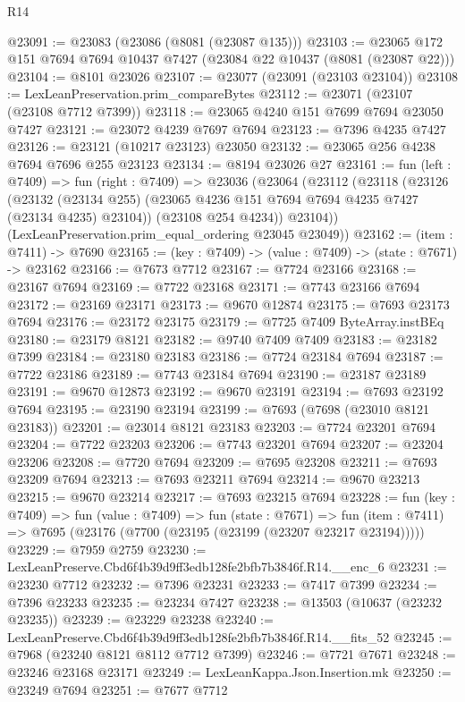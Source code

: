 \begin{lexlean}{R14}
\begin{coremodule}
@23091 := @23083 (@23086 (@8081 (@23087 @135)))
@23103 := @23065 @172 @151 @7694 @7694 @10437 @7427 (@23084 @22 @10437 (@8081 (@23087 @22)))
@23104 := @8101 @23026
@23107 := @23077 (@23091 (@23103 @23104))
@23108 := LexLeanPreservation.prim_compareBytes
@23112 := @23071 (@23107 (@23108 @7712 @7399))
@23118 := @23065 @4240 @151 @7699 @7694 @23050 @7427
@23121 := @23072 @4239 @7697 @7694
@23123 := @7396 @4235 @7427
@23126 := @23121 (@10217 @23123) @23050
@23132 := @23065 @256 @4238 @7694 @7696 @255 @23123
@23134 := @8194 @23026 @27
@23161 := fun (left : @7409) =>
  fun (right : @7409) =>
  @23036
    (@23064
      (@23112
        (@23118
          (@23126
            (@23132 (@23134 @255) (@23065 @4236 @151 @7694 @7694 @4235 @7427 (@23134 @4235) @23104))
            (@23108 @254 @4234))
          @23104))
      (LexLeanPreservation.prim_equal_ordering @23045 @23049))
@23162 := (item : @7411) -> @7690
@23165 := (key : @7409) -> (value : @7409) -> (state : @7671) -> @23162
@23166 := @7673 @7712
@23167 := @7724 @23166
@23168 := @23167 @7694
@23169 := @7722 @23168
@23171 := @7743 @23166 @7694
@23172 := @23169 @23171
@23173 := @9670 @12874
@23175 := @7693 @23173 @7694
@23176 := @23172 @23175
@23179 := @7725 @7409 ByteArray.instBEq
@23180 := @23179 @8121
@23182 := @9740 @7409 @7409
@23183 := @23182 @7399
@23184 := @23180 @23183
@23186 := @7724 @23184 @7694
@23187 := @7722 @23186
@23189 := @7743 @23184 @7694
@23190 := @23187 @23189
@23191 := @9670 @12873
@23192 := @9670 @23191
@23194 := @7693 @23192 @7694
@23195 := @23190 @23194
@23199 := @7693 (@7698 (@23010 @8121 @23183))
@23201 := @23014 @8121 @23183
@23203 := @7724 @23201 @7694
@23204 := @7722 @23203
@23206 := @7743 @23201 @7694
@23207 := @23204 @23206
@23208 := @7720 @7694
@23209 := @7695 @23208
@23211 := @7693 @23209 @7694
@23213 := @7693 @23211 @7694
@23214 := @9670 @23213
@23215 := @9670 @23214
@23217 := @7693 @23215 @7694
@23228 := fun (key : @7409) =>
  fun (value : @7409) =>
  fun (state : @7671) =>
  fun (item : @7411) => @7695 (@23176 (@7700 (@23195 (@23199 (@23207 @23217 @23194)))))
@23229 := @7959 @2759
@23230 := LexLeanPreserve.Cbd6f4b39d9ff3edb128fe2bfb7b3846f.R14.__enc_6
@23231 := @23230 @7712
@23232 := @7396 @23231
@23233 := @7417 @7399
@23234 := @7396 @23233
@23235 := @23234 @7427
@23238 := @13503 (@10637 (@23232 @23235))
@23239 := @23229 @23238
@23240 := LexLeanPreserve.Cbd6f4b39d9ff3edb128fe2bfb7b3846f.R14.__fits_52
@23245 := @7968 (@23240 @8121 @8112 @7712 @7399)
@23246 := @7721 @7671
@23248 := @23246 @23168 @23171
@23249 := LexLeanKappa.Json.Insertion.mk
@23250 := @23249 @7694
@23251 := @7677 @7712

\end{coremodule}
\end{lexlean}
